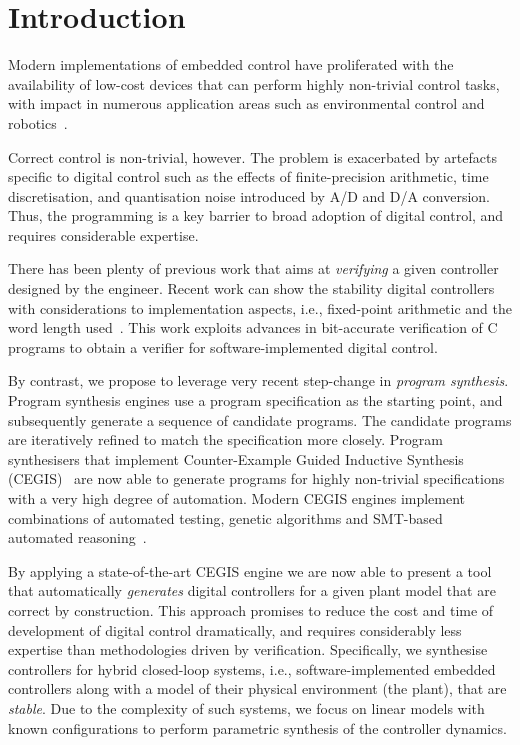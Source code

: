 \documentclass{sig-alternate-05-2015}
\begin{document}
%
%
\printccsdesc



\section{Introduction}

Modern implementations of embedded control have proliferated with the
availability of low-cost devices that can perform highly non-trivial control
tasks, with impact in numerous application areas such as environmental
control and robotics~\cite{astrom1997computer, Franklin15}.

Correct control is non-trivial, however. The problem is exacerbated by
artefacts specific to digital control such as the effects of
finite-precision arithmetic, time discretisation, and quantisation noise
introduced by A/D and D/A conversion.  Thus, the programming is a key
barrier to broad adoption of digital control, and requires considerable
expertise.

There has been plenty of previous work that aims at \emph{verifying} a given
controller designed by the engineer.  Recent work can show the stability
digital controllers with considerations to implementation aspects, i.e.,
fixed-point arithmetic and the word length used~\cite{Bessa16}.  This work
exploits advances in bit-accurate verification of C programs to obtain a
verifier for software-implemented digital control.

By contrast, we propose to leverage very recent step-change in \emph{program
synthesis}.  Program synthesis engines use a program specification as the
starting point, and subsequently generate a sequence of candidate programs. 
The candidate programs are iteratively refined to match the specification
more closely.  Program synthesisers that implement Counter-Example Guided
Inductive Synthesis (CEGIS)~\cite{sketch} are now able to generate programs
for highly non-trivial specifications with a very high degree of automation. 
Modern CEGIS engines implement combinations of automated testing, genetic
algorithms and SMT-based automated reasoning~\cite{DBLP:conf/lpar/DavidKL15,
DBLP:conf/cav/0001A14}.

By applying a state-of-the-art CEGIS engine we are now able to present a
tool that automatically \emph{generates} digital controllers for a given
plant model that are correct by construction.  This approach promises to
reduce the cost and time of development of digital control dramatically, and
requires considerably less expertise than methodologies driven by
verification.  Specifically, we synthesise controllers for hybrid
closed-loop systems, i.e., software-implemented embedded controllers along
with a model of their physical environment (the plant), that are
\emph{stable}.  Due to the complexity of such systems, we focus on linear
models with known configurations to perform parametric synthesis of the
controller dynamics.
\end{document}
